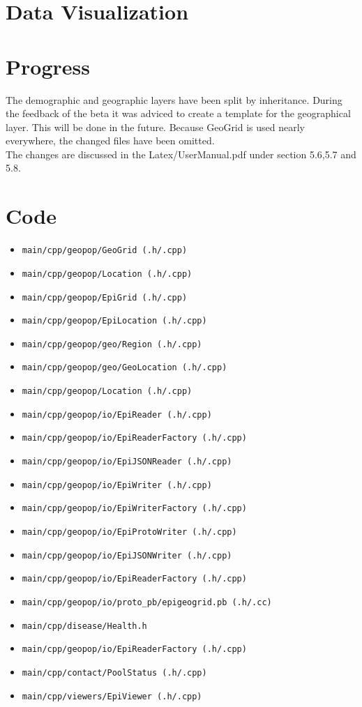 \documentclass[runningheads]{llncs}
\begin{document}
\section{Data Visualization}
\section{Progress}
The demographic and geographic layers have been split by inheritance. During the feedback of the beta it was adviced to create a template for the geographical layer. This will be done in the future. Because GeoGrid is used nearly everywhere, the changed files have been omitted. \\
The changes are discussed in the Latex/UserManual.pdf under section 5.6,5.7 and 5.8.
\section{Code}
	\begin{itemize}
		\item \texttt{main/cpp/geopop/GeoGrid (.h/.cpp)}
		\item \texttt{main/cpp/geopop/Location (.h/.cpp)}
		\item \texttt{main/cpp/geopop/EpiGrid (.h/.cpp)}
		\item \texttt{main/cpp/geopop/EpiLocation (.h/.cpp)}
		\item \texttt{main/cpp/geopop/geo/Region (.h/.cpp)}
		\item \texttt{main/cpp/geopop/geo/GeoLocation (.h/.cpp)}
		\item \texttt{main/cpp/geopop/Location (.h/.cpp)}
		\item \texttt{main/cpp/geopop/io/EpiReader (.h/.cpp)}
		\item \texttt{main/cpp/geopop/io/EpiReaderFactory (.h/.cpp)}
		\item \texttt{main/cpp/geopop/io/EpiJSONReader (.h/.cpp)}
		\item \texttt{main/cpp/geopop/io/EpiWriter (.h/.cpp)}
		\item \texttt{main/cpp/geopop/io/EpiWriterFactory (.h/.cpp)}
		\item \texttt{main/cpp/geopop/io/EpiProtoWriter (.h/.cpp)}
		\item \texttt{main/cpp/geopop/io/EpiJSONWriter (.h/.cpp)}
		\item \texttt{main/cpp/geopop/io/EpiReaderFactory (.h/.cpp)}
		\item \texttt{main/cpp/geopop/io/proto\_pb/epigeogrid.pb (.h/.cc)}
		\item \texttt{main/cpp/disease/Health.h}
		\item \texttt{main/cpp/geopop/io/EpiReaderFactory (.h/.cpp)}
		\item \texttt{main/cpp/contact/PoolStatus (.h/.cpp)}
		\item \texttt{main/cpp/viewers/EpiViewer (.h/.cpp)}
	\end{itemize}
\end{document}
